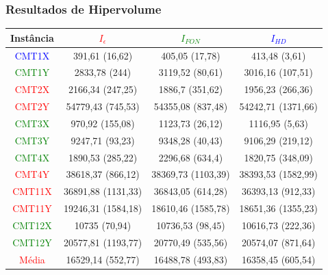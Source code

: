 \documentclass{beamer}
\begin{document}
\begin{frame}
  \frametitle{Resultados de Hipervolume}
    \footnotesize{
    \begin{tabular}{c|ccc}
\hline
Instância & \textcolor{red}{$I_{\epsilon}$}             & \textcolor{green}{$I_{FON}$}             & \textcolor{blue}{ $I_{HD}$}      \\
\hline
\textcolor{blue}{CMT1X}     & 391,61 (16,62)     & 405,05 (17,78)     & 413,48 (3,61)      \\
\textcolor{green}{CMT1Y}     & 2833,78 (244)      & 3119,52 (80,61)    & 3016,16 (107,51)   \\
\textcolor{red}{CMT2X}     & 2166,34 (247,25)   & 1886,7 (351,62)    & 1956,23 (266,36)   \\
\textcolor{red}{CMT2Y}     & 54779,43 (745,53)  & 54355,08 (837,48)  & 54242,71 (1371,66) \\
\textcolor{green}{CMT3X}     & 970,92 (155,08)    & 1123,73 (26,12)    & 1116,95 (5,63)     \\
\textcolor{green}{CMT3Y}     & 9247,71 (93,23)    & 9348,28 (40,43)    & 9106,29 (219,12)   \\
\textcolor{green}{CMT4X}     & 1890,53 (285,22)   & 2296,68 (634,4)    & 1820,75 (348,09)   \\
\textcolor{red}{CMT4Y}     & 38618,37 (866,12)  & 38369,73 (1103,39) & 38393,53 (1582,99) \\
\textcolor{red}{CMT11X}    & 36891,88 (1131,33) & 36843,05 (614,28)  & 36393,13 (912,33)  \\
\textcolor{red}{CMT11Y}    & 19246,31 (1584,18) & 18610,46 (1585,78) & 18651,36 (1355,23) \\
\textcolor{green}{CMT12X }   & 10735 (70,94)      & 10736,53 (98,45)   & 10616,73 (222,36)  \\
\textcolor{green}{CMT12Y}    & 20577,81 (1193,77) & 20770,49 (535,56)  & 20574,07 (871,64)  \\
\hline
\textcolor{red}{Média} & 16529,14 (552,77)  & 16488,78 (493,83)  & 16358,45 (605,54)  \\
\hline
\end{tabular}
  }
\end{frame}
\end{document}
